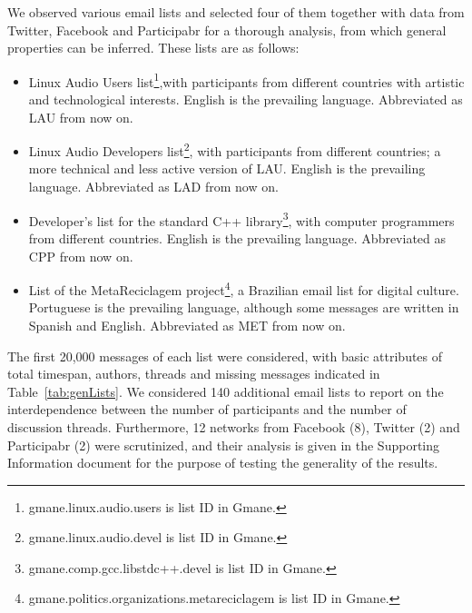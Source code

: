 \documentclass[%
aip,
jmp,%
amsmath,amssymb,
reprint,%
]{revtex4-1}
\begin{document}
We observed various email lists and selected four of them together with data from Twitter, Facebook and Participabr for a thorough analysis,
from which general properties can be inferred. These lists are as follows:

\begin{itemize}
\item Linux Audio Users list\footnote{gmane.linux.audio.users is list ID in Gmane.},with participants from different countries with artistic and technological interests. English is the prevailing language. Abbreviated as LAU from now on.

\item Linux Audio Developers list\footnote{gmane.linux.audio.devel is list ID in Gmane.}, with participants from different countries; a more technical and less active version of LAU. English is the prevailing language. Abbreviated as LAD from now on.

\item Developer's list for the standard C++ library\footnote{gmane.comp.gcc.libstdc++.devel is list ID in Gmane.}, with computer programmers from different countries. English is the prevailing language. Abbreviated as CPP from now on.
\item List of the MetaReciclagem project\footnote{gmane.politics.organizations.metareciclagem is list ID in Gmane.}, a Brazilian email list for digital culture. 	Portuguese is the prevailing language, although some messages are written in Spanish and English. Abbreviated as MET from now on.
\end{itemize} 

The first 20,000 messages of each list were considered, with basic attributes of total timespan, authors, threads and missing messages indicated in Table~\ref{tab:genLists}. We considered 140 additional email lists to report on the interdependence between the number of participants and the number of discussion threads. Furthermore, 12 networks from Facebook (8), Twitter (2) and Participabr (2) were scrutinized, and their analysis is given in the Supporting Information document for the purpose of testing the generality of the results.
\end{document}
